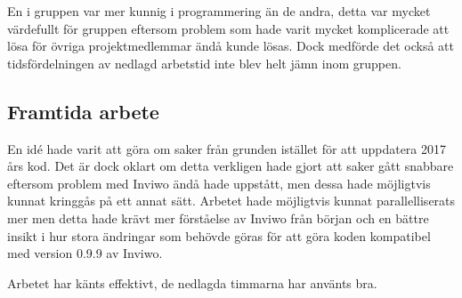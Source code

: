 \documentclass[a4paper,12pt]{article}
\begin{document}
En i gruppen var mer kunnig i programmering än de andra, detta var mycket värdefullt för gruppen eftersom problem som hade varit mycket komplicerade att lösa för övriga projektmedlemmar ändå kunde lösas. Dock medförde det också att tidsfördelningen av nedlagd arbetstid inte blev helt jämn inom gruppen.  

\subsection{Framtida arbete}
En idé hade varit att göra om saker från grunden istället för att uppdatera 2017 års kod. Det är dock oklart om detta verkligen hade gjort att saker gått snabbare eftersom problem med Inviwo ändå hade uppstått, men dessa hade möjligtvis kunnat kringgås på ett annat sätt. Arbetet hade möjligtvis kunnat parallelliserats mer men detta hade krävt mer förståelse av Inviwo från början och en bättre insikt i hur stora ändringar som behövde göras för att göra koden kompatibel med version 0.9.9 av Inviwo.  

Arbetet har känts effektivt, de nedlagda timmarna har använts bra. 



\newpage
{}
\printbibliography{}
\end{document}

